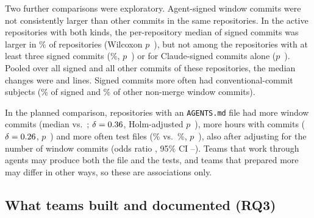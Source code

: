 \documentclass{article}
\begin{document}
Two further comparisons were exploratory. Agent-signed window commits were not consistently larger than other commits in the same repositories. In the \NRqTwoTracesCommitSizeAllRepos{} active repositories with both kinds, the per-repository median of signed commits was larger in \NRqTwoTracesCommitSizeAllSignedLargerPct\% of repositories (Wilcoxon $p$~\NRqTwoTracesCommitSizeAllP), but not among the \NRqTwoTracesCommitSizeMinThreeRepos{} repositories with at least three signed commits (\NRqTwoTracesCommitSizeMinThreeSignedLargerPct\%, $p$~\NRqTwoTracesCommitSizeMinThreeP) or for Claude-signed commits alone ($p$~\NRqTwoTracesCommitSizeClaudeP). Pooled over all signed and all other commits of these repositories, the median changes were \NRqTwoTracesCommitSizePooledSigned{} and \NRqTwoTracesCommitSizePooledUnsigned{} lines. Signed commits more often had conventional-commit subjects (\NRqTwoTracesConventionalSignedPct\% of signed and \NRqTwoTracesConventionalUnsignedPct\% of other non-merge window commits).

In the planned comparison, repositories with an \texttt{AGENTS.md} file had more window commits (median \NRqTwoTracesAgentsMdAssocCommitsWith{} vs.\ \NRqTwoTracesAgentsMdAssocCommitsWithout; $\delta = \num{0.36}$, Holm-adjusted $p$~\NRqTwoTracesAgentsMdAssocCommitsP), more hours with commits ($\delta = \num{0.26}$, $p$~\NRqTwoTracesAgentsMdAssocHoursP) and more often test files (\NRqTwoTracesAgentsMdAssocTestsWith\% vs.\ \NRqTwoTracesAgentsMdAssocTestsWithout\%, $p$~\NRqTwoTracesAgentsMdAssocTestsP), also after adjusting for the number of window commits (odds ratio \NRqTwoTracesAgentsMdAssocTestsAdjustedOr, 95\% CI \NRqTwoTracesAgentsMdAssocTestsAdjustedLo--\NRqTwoTracesAgentsMdAssocTestsAdjustedHi). Teams that work through agents may produce both the file and the tests, and teams that prepared more may differ in other ways, so these are associations only.

\subsection{What teams built and documented (RQ3)}\label{sec:product}
\end{document}
